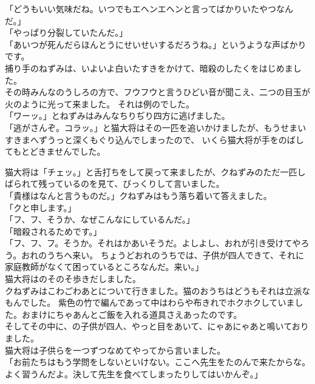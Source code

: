 \documentclass[
a4paper,
10pt,
book]
{tarticle}
\begin{document}
\newpage
\thispagestyle{fancy}
\fancyhead[R]{\empty}
「どうもいい気味だね。いつでもエヘンエヘンと言ってばかりいたやつなんだ。」\\
「やっぱり分裂していたんだ。」\\
「あいつが死んだらほんとうにせいせいするだろうね。」というような声ばかりです。\\
\indent 捕り手のねずみは、いよいよ白いたすきをかけて、暗殺のしたくをはじめました。\\
\indent その時みんなのうしろの方で、フウフウと言うひどい音が聞こえ、二つの目玉が火のように光って来ました。
それは例のでした。\\
「ワーッ。」とねずみはみんなちりぢり四方に逃げました。\\
「逃がさんぞ。コラッ。」と猫大将はその一匹を追いかけましたが、もうせまいすきまへずうっと深くもぐり込んでしまったので、
いくら猫大将が手をのばしてもとどきませんでした。

\newpage
\thispagestyle{fancy}
\fancyhead[C]{\empty}
\indent 猫大将は「チェッ。」と舌打ちをして戻って来ましたが、クねずみのただ一匹しばられて残っているのを見て、びっくりして言いました。\\
「貴様はなんと言うものだ。」クねずみはもう落ち着いて答えました。\\
「クと申します。」\\
「フ、フ、そうか、なぜこんなにしているんだ。」\\
「暗殺されるためです。」\\
「フ、フ、フ。そうか。それはかあいそうだ。よしよし、おれが引き受けてやろう。おれのうちへ来い。
ちょうどおれのうちでは、子供が四人できて、それに家庭教師がなくて困っているところなんだ。来い。」\\
\indent 猫大将はのそのそ歩きだしました。\\
\indent クねずみはこわごわあとについて行きました。猫のおうちはどうもそれは立派なもんでした。
紫色の竹で編んであって中はわらや布きれでホクホクしていました。おまけにちゃあんとご飯を入れる道具さえあったのです。\\
\indent そしてその中に、の子供が四人、やっと目をあいて、にゃあにゃあと鳴いておりました。\\
\indent 猫大将は子供らを一つずつなめてやってから言いました。\\
「お前たちはもう学問をしないといけない。ここへ先生をたのんで来たからな。よく習うんだよ。決して先生を食べてしまったりしてはいかんぞ。」
\end{document}
